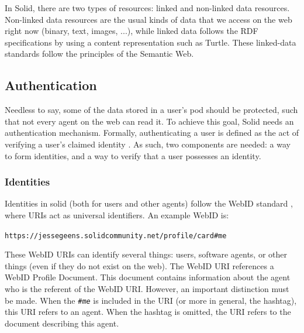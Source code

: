 In Solid, there are two types of resources: linked and non-linked data resources. Non-linked data resources are the usual kinds of data that we access on the web right now (binary, text, images, ...), while linked data follows the 
 \gls{RDF} specifications by using a content representation such as Turtle. These linked-data standards follow the principles of the Semantic Web.

\subsection{Authentication}
\label{sec:solid-authentication}
Needless to say, some of the data stored in a user's pod should be protected, such that not every agent on the web can read it. To achieve this goal, Solid needs an authentication mechanism. Formally, authenticating a user is defined as the act of verifying a user's claimed identity \citep{solid}. As such, two components are needed: a way to form identities, and a way to verify that a user possesses an identity.

\newpage
\subsubsection{Identities}
Identities in solid (both for users and other agents) follow the WebID standard \citep{webid}, where URIs act as universal identifiers. An example WebID is:

\begin{center}
   \texttt{https://jessegeens.solidcommunity.net/profile/card\#me}\\
\end{center}

\noindent These WebID URIs can identify several things: users, software agents, or other things (even if they do not exist on the web). The WebID URI references a WebID Profile Document. This document contains information about the agent who is the referent of the WebID URI. However, an important distinction must be made. When the \textit{\texttt{\#me}} is included in the URI (or more in general, the hashtag), this URI refers to an agent. When the hashtag is omitted, the URI refers to the document describing this agent.

{}

